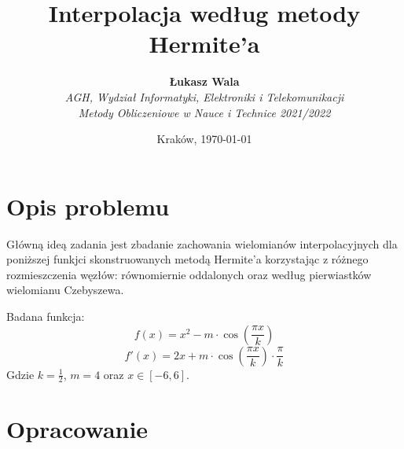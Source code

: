 \documentclass{article}
\title{Interpolacja według metody Hermite'a}
\author{\textbf{Łukasz Wala}\\
    \textit{AGH, Wydział Informatyki, Elektroniki i Telekomunikacji} \\
    \textit{Metody Obliczeniowe w Nauce i Technice 2021/2022}}
\date{Kraków, \today}
\begin{document}
\maketitle

\section{Opis problemu}
Główną ideą zadania jest zbadanie zachowania wielomianów interpolacyjnych
dla poniższej funkjci skonstruowanych metodą Hermite'a korzystając z różnego 
rozmieszczenia węzłów: równomiernie oddalonych oraz według pierwiastków wielomianu
Czebyszewa.

Badana funkcja:
\[f(x)=x^2-m\cdot\cos\left(\frac{\pi x}{k}\right)\]
\[f'(x) = 2x+m\cdot\cos(\frac{\pi x}{k})\cdot\frac{\pi}{k}\]
Gdzie $k=\frac{1}{2}$, $m=4$ oraz $x\in [-6,6]$.


\section{Opracowanie}
\end{document}

